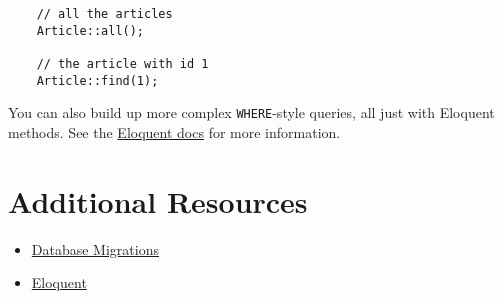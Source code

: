 \begin{verbatim}
    // all the articles
    Article::all();

    // the article with id 1
    Article::find(1);
\end{verbatim}

You can also build up more complex \texttt{WHERE}-style queries, all just with Eloquent methods. See the \href{http://laravel.com/docs/master/eloquent}{Eloquent docs} for more information.



\section{Additional Resources}

\begin{itemize}[leftmargin=*]
    \item \href{http://laravel.com/docs/master/migrations}{Database Migrations}
    \item \href{http://laravel.com/docs/master/eloquent}{Eloquent}
\end{itemize}
